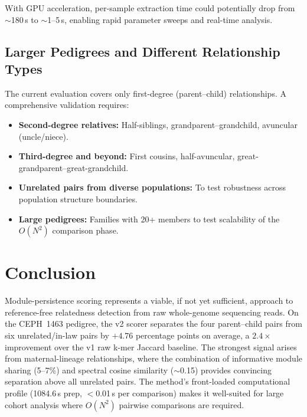 \documentclass{../yalumba}
\begin{document}
With GPU acceleration, per-sample extraction time could potentially drop
from $\sim$180\,s to $\sim$1--5\,s, enabling rapid parameter sweeps and
real-time analysis.

\subsection{Larger Pedigrees and Different Relationship Types}

The current evaluation covers only first-degree (parent--child) relationships.
A comprehensive validation requires:

\begin{itemize}
  \item \textbf{Second-degree relatives:}  Half-siblings, grandparent--grandchild,
        avuncular (uncle/niece).
  \item \textbf{Third-degree and beyond:}  First cousins, half-avuncular,
        great-grandparent--great-grandchild.
  \item \textbf{Unrelated pairs from diverse populations:}  To test robustness
        across population structure boundaries.
  \item \textbf{Large pedigrees:}  Families with 20+ members to test
        scalability of the $O(N^2)$ comparison phase.
\end{itemize}


\section{Conclusion}
\label{sec:conclusion}

Module-persistence scoring represents a viable, if not yet sufficient,
approach to reference-free relatedness detection from raw whole-genome
sequencing reads.  On the CEPH~1463 pedigree, the v2 scorer separates the
four parent--child pairs from six unrelated/in-law pairs by $+4.76$
percentage points on average, a $2.4\times$ improvement over the v1 raw k-mer
Jaccard baseline.  The strongest signal arises from maternal-lineage
relationships, where the combination of informative module sharing (5--7\%)
and spectral cosine similarity ($\sim$0.15) provides convincing separation
above all unrelated pairs.  The method's front-loaded computational profile
(1084.6\,s prep, $<$0.01\,s per comparison) makes it well-suited for large
cohort analysis where $O(N^2)$ pairwise comparisons are required.
\end{document}
